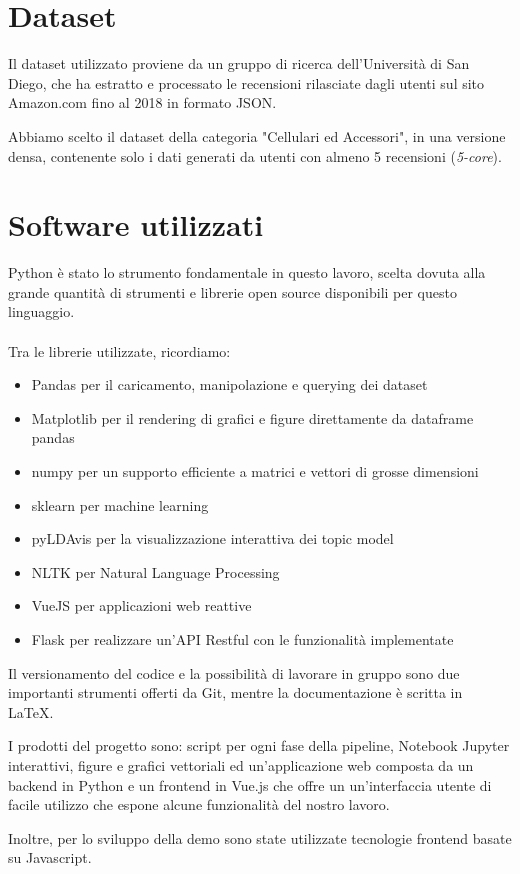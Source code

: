\section{Dataset}

Il dataset utilizzato \cite{amazondataset} proviene da un gruppo di ricerca dell'Università di San Diego, che ha estratto e processato le recensioni rilasciate dagli utenti sul sito Amazon.com fino al 2018 in formato JSON.
\par
Abbiamo scelto il dataset della categoria "Cellulari ed Accessori", in una versione densa, contenente solo i dati generati da utenti con almeno 5 recensioni (\textit{5-core}).

\section{Software utilizzati}

Python è stato lo strumento fondamentale in questo lavoro, scelta dovuta alla grande quantità di strumenti e librerie open source disponibili per questo linguaggio.
\paragraph{}
Tra le librerie utilizzate, ricordiamo:
\begin{itemize}
    \item Pandas per il caricamento, manipolazione e querying dei dataset
    \item Matplotlib per il rendering di grafici e figure direttamente da dataframe pandas
    \item numpy per un supporto efficiente a matrici e vettori di grosse dimensioni
    \item sklearn per machine learning
    \item pyLDAvis per la visualizzazione interattiva dei topic model
    \item NLTK per Natural Language Processing
    \item VueJS per applicazioni web reattive
    \item Flask per realizzare un'API Restful con le funzionalità implementate
\end{itemize}

Il versionamento del codice e la possibilità di lavorare in gruppo sono due importanti strumenti offerti da Git, mentre la documentazione è scritta in \LaTeX{}. 
\par
I prodotti del progetto sono: script per ogni fase della pipeline, Notebook Jupyter interattivi, figure e grafici vettoriali ed un'applicazione web composta da un backend in Python e un frontend in Vue.js che offre un un'interfaccia utente di facile utilizzo che espone alcune funzionalità del nostro lavoro.
\par
Inoltre, per lo sviluppo della demo sono state utilizzate tecnologie frontend basate su Javascript.